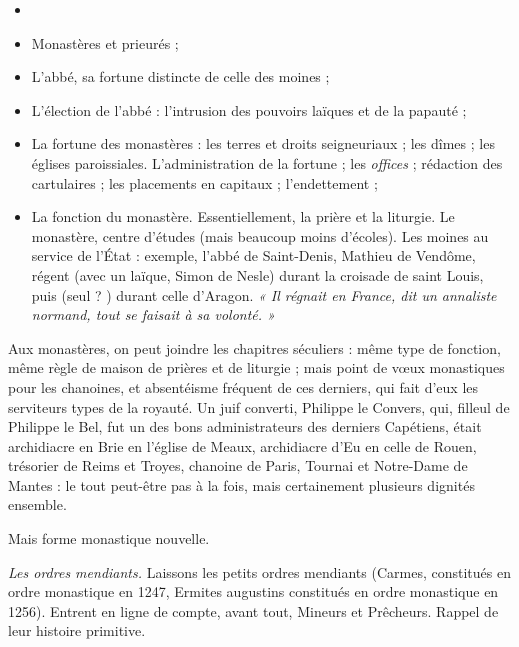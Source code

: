 \documentclass[french,twoside]{book} %
\newcommand{\labelchar}[1]{{\color{rubric}\bf #1}}
\begin{document}
\begin{itemize}[itemsep=0pt,]
\item[] \hspace{-1.5em}{\bfseries Quelques grands faits :}
\item Monastères et prieurés ;
\item L’abbé, sa fortune distincte de celle des moines ;
\item L’élection de l’abbé : l’intrusion des pouvoirs laïques et de la papauté ;
\item La fortune des monastères : les terres et droits seigneuriaux ; les dîmes ; les églises paroissiales. L’administration de la fortune ; les \emph{offices} ; rédaction des cartulaires ; les placements en capitaux ; l’endettement ;
\item La fonction du monastère. Essentiellement, la prière et la liturgie. Le monastère, centre d’études (mais beaucoup moins d’écoles). Les moines au service de l’État : exemple, l’abbé de Saint-Denis, Mathieu de Vendôme, régent (avec un laïque, Simon de Nesle) durant la croisade de saint Louis, puis (seul ? ) durant celle d’Aragon. \emph{« Il régnait en France, dit un annaliste normand, tout se faisait à sa volonté. »}
\end{itemize}
\noindent Aux monastères, on peut joindre les chapitres séculiers : même type de fonction, même règle de maison de prières et de liturgie ; mais point de vœux monastiques pour les chanoines, et absentéisme fréquent de ces derniers, qui fait d’eux les serviteurs types de la royauté. Un juif converti, Philippe le Convers, qui, filleul de Philippe le Bel, fut un des bons administrateurs des derniers Capétiens, était archidiacre en Brie en l’église de Meaux, archidiacre d’Eu en celle de Rouen, trésorier de Reims et Troyes, chanoine de Paris, Tournai et Notre-Dame de Mantes : le tout peut-être pas à la fois, mais certainement plusieurs dignités ensemble.\par
Mais forme monastique nouvelle.\par
\bigbreak
\noindent \labelchar{2)} {\itshape Les ordres mendiants.} Laissons les petits ordres mendiants (Carmes, constitués en ordre monastique en 1247, Ermites augustins constitués en ordre monastique en 1256). Entrent en ligne de compte, avant tout, Mineurs et Prêcheurs. Rappel de leur histoire primitive.\par
\end{document}
